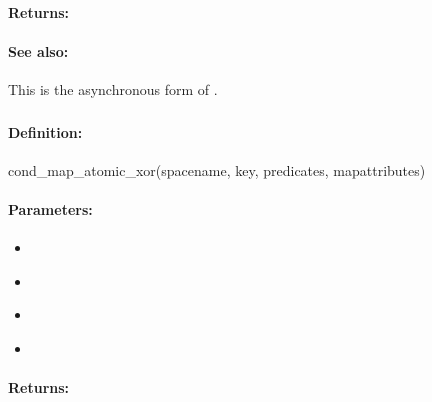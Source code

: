 \paragraph{Returns:}


\paragraph{See also:}  This is the asynchronous form of .

\pagebreak
\subsubsection{}
\label{api:ruby:cond_map_atomic_xor}


\paragraph{Definition:}
\begin{rubycode}
cond_map_atomic_xor(spacename, key, predicates, mapattributes)
\end{rubycode}

\paragraph{Parameters:}
\begin{itemize}[noitemsep]
\item {}\\

\item {}\\

\item {}\\

\item {}\\

\end{itemize}

\paragraph{Returns:}


